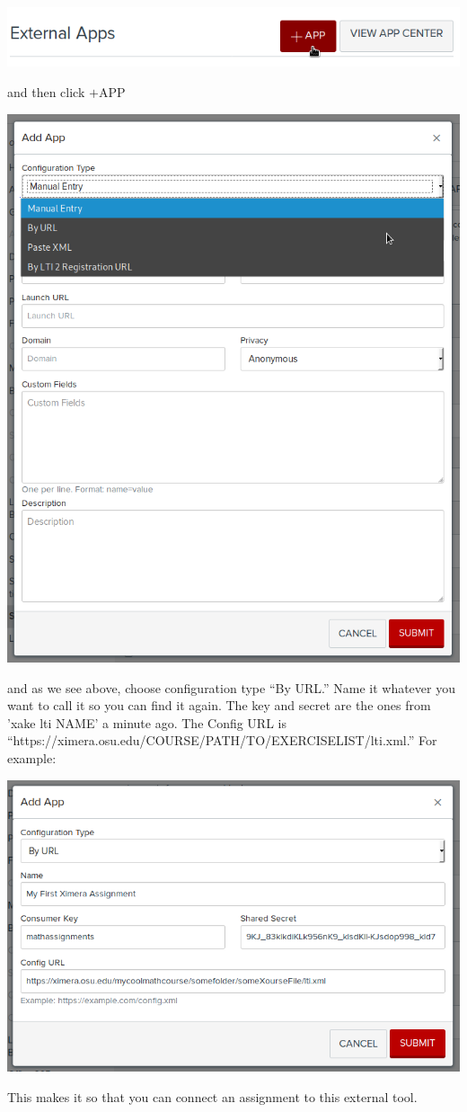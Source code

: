 \documentclass{ximera}
\begin{document}
\begin{image}
\includegraphics{canvas2.png}
\end{image}
and then click $+$APP
\begin{image}
\includegraphics{canvas3.png}
\end{image}
and as we see above, choose configuration type ``By URL.''
Name it whatever you want to call it so you can find it again.
The key and secret are the ones from 'xake lti NAME' a minute ago.
The Config URL is ``https://ximera.osu.edu/COURSE/PATH/TO/EXERCISELIST/lti.xml.'' For example:
\begin{image}
\includegraphics{canvas4.png}
\end{image}
This makes it so that you can connect an assignment to this external tool.
\end{document}
